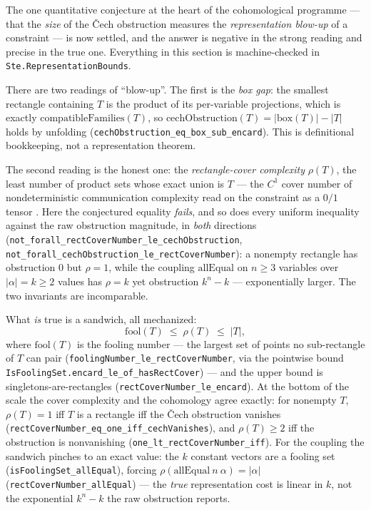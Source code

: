 \documentclass[11pt]{article}
\newcommand{\lean}[1]{\texttt{#1}}
\begin{document}
The one quantitative conjecture at the heart of the cohomological
programme --- that the \emph{size} of the \v{C}ech obstruction measures
the \emph{representation blow-up} of a constraint --- is now settled, and
the answer is negative in the strong reading and precise in the true one.
Everything in this section is machine-checked in
\lean{Ste.RepresentationBounds}.

There are two readings of ``blow-up''.  The first is the \emph{box gap}:
the smallest rectangle containing $T$ is the product of its per-variable
projections, which is exactly $\mathrm{compatibleFamilies}(T)$, so
$\mathrm{cechObstruction}(T) = |\mathrm{box}(T)| - |T|$ holds by
unfolding (\lean{cechObstruction\_eq\_box\_sub\_encard}).  This is
definitional bookkeeping, not a representation theorem.

The second reading is the honest one: the \emph{rectangle-cover
complexity} $\rho(T)$, the least number of product sets whose exact union
is $T$ --- the $C^1$ cover number of nondeterministic communication
complexity read on the constraint as a $0/1$ tensor
\citep{aho1983notions,kushilevitz1997communication,yannakakis1991expressing}.
Here the conjectured equality \emph{fails}, and so does every uniform
inequality against the raw obstruction magnitude, in \emph{both}
directions (\lean{not\_forall\_rectCoverNumber\_le\_cechObstruction},
\lean{not\_forall\_cechObstruction\_le\_rectCoverNumber}): a nonempty
rectangle has obstruction $0$ but $\rho = 1$, while the coupling
$\mathrm{allEqual}$ on $n \ge 3$ variables over $|\alpha| = k \ge 2$
values has $\rho = k$ yet obstruction $k^n - k$ ---
exponentially larger.  The two invariants are incomparable.

What \emph{is} true is a sandwich, all mechanized:
\[
  \mathrm{fool}(T) \;\le\; \rho(T) \;\le\; |T|,
\]
where $\mathrm{fool}(T)$ is the fooling number --- the largest set of
points no sub-rectangle of $T$ can pair
(\lean{foolingNumber\_le\_rectCoverNumber}, via the pointwise bound
\lean{IsFoolingSet.encard\_le\_of\_hasRectCover}) --- and the upper bound
is singletons-are-rectangles (\lean{rectCoverNumber\_le\_encard}).  At the
bottom of the scale the cover complexity and the cohomology agree
exactly: for nonempty $T$, $\rho(T) = 1$ iff $T$ is a rectangle iff the
\v{C}ech obstruction vanishes
(\lean{rectCoverNumber\_eq\_one\_iff\_cechVanishes}), and $\rho(T) \ge 2$
iff the obstruction is nonvanishing (\lean{one\_lt\_rectCoverNumber\_iff}).
For the coupling the sandwich pinches to an exact value: the $k$ constant
vectors are a fooling set (\lean{isFoolingSet\_allEqual}), forcing
$\rho(\mathrm{allEqual}\ n\ \alpha) = |\alpha|$
(\lean{rectCoverNumber\_allEqual}) --- the \emph{true} representation cost
is linear in $k$, not the exponential $k^n - k$ the raw obstruction
reports.
\end{document}
